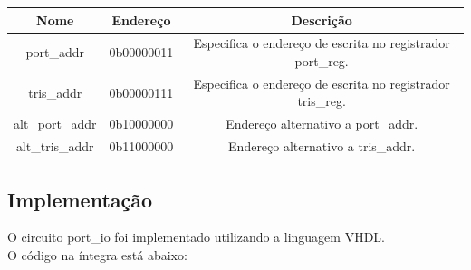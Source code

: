 \documentclass{article}
\begin{document}
\begin{table}[ht]
\begin{center}
\begin{tabular}{|c|c|c|}
    \hline
    Nome & Endereço & Descrição \\
    \hline
    port\_addr & 0b00000011 & Especifica o endereço de escrita no registrador port\_reg. \\
    \hline
    tris\_addr & 0b00000111 & Especifica o endereço de escrita no registrador tris\_reg. \\
    \hline
    alt\_port\_addr & 0b10000000 & Endereço alternativo a port\_addr. \\
    \hline
    alt\_tris\_addr & 0b11000000 & Endereço alternativo a tris\_addr. \\
    \hline
\end{tabular}
\end{center}
\end{table}

\subsection{Implementação}

O circuito port\_io foi implementado utilizando a linguagem VHDL.\\

O código na íntegra está abaixo:\\
\end{document}
